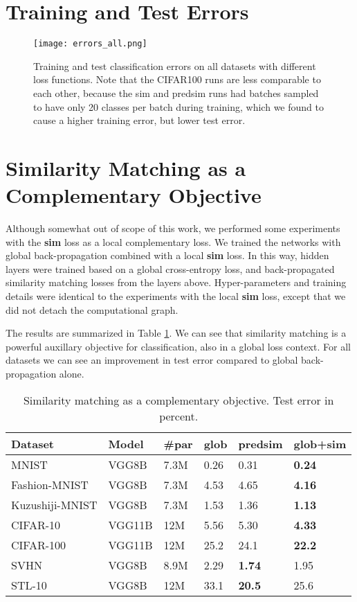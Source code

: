 \documentclass{article}
\begin{document}
\newpage



\newpage
\onecolumn
\appendix
\appendixpage
\section{Training and Test Errors}

\begin{figure*}[h]
  \texttt{[image: errors\_all.png]}
  \caption{Training and test classification errors on all datasets with different loss functions. Note that the CIFAR100 runs are less comparable to each other, because the sim and predsim runs had batches sampled to have only 20 classes per batch during training, which we found to cause a higher training error, but lower test error. }
  \label{fig:errors_all}
\end{figure*}

\newpage
\section{Similarity Matching as a Complementary Objective}
Although somewhat out of scope of this work, we performed some experiments with the \textbf{sim} loss as a local complementary loss. We trained the networks with global back-propagation combined with a local \textbf{sim} loss. In this way, hidden layers were trained based on a global cross-entropy loss, and back-propagated similarity matching losses from the layers above. Hyper-parameters and training details were identical to the experiments with the local \textbf{sim} loss, except that we did not detach the computational graph.

The results are summarized in Table \ref{table:complementary_sim}. We can see that similarity matching is a powerful auxillary objective for classification, also in a global loss context. For all datasets we can see an improvement in test error compared to global back-propagation alone.

\begin{table}[h]
  \caption{Similarity matching as a complementary objective. Test error in percent.}
  \label{table:complementary_sim}
  \centering
  \begin{tabular}{llllll}
    \toprule
    Dataset   & Model & \#par & glob & predsim & glob+sim  \\
    \midrule
    MNIST           & VGG8B & 7.3M & 0.26  & 0.31 & \textbf{0.24} \\
    Fashion-MNIST   & VGG8B & 7.3M & 4.53  & 4.65 & \textbf{4.16} \\
    Kuzushiji-MNIST & VGG8B & 7.3M & 1.53  & 1.36 & \textbf{1.13} \\
    CIFAR-10        & VGG11B & 12M & 5.56  & 5.30 & \textbf{4.33} \\
    CIFAR-100       & VGG11B & 12M & 25.2  & 24.1 & \textbf{22.2} \\
    SVHN            & VGG8B & 8.9M & 2.29  & \textbf{1.74} & 1.95 \\
    STL-10          & VGG8B & 12M  & 33.1  & \textbf{20.5} & 25.6 \\
    \bottomrule
  \end{tabular}
\end{table}
\end{document}
